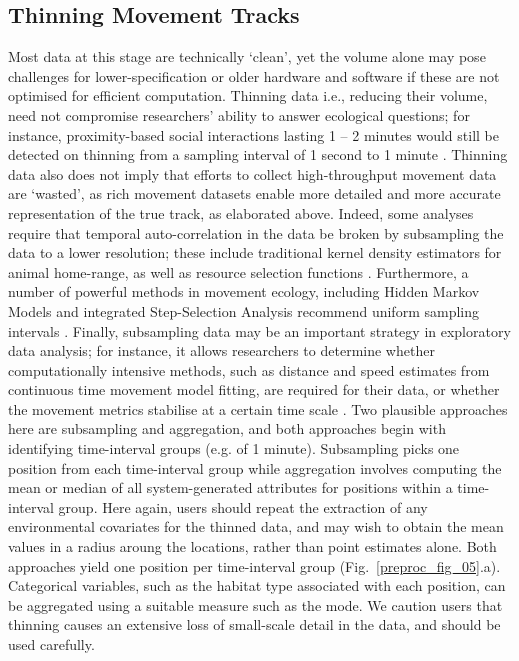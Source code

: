     \subsection*{Thinning Movement Tracks}

    Most data at this stage are technically ‘clean', yet the volume alone may pose challenges for lower-specification or older hardware and software if these are not optimised for efficient computation.
    Thinning data i.e., reducing their volume, need not compromise researchers' ability to answer ecological questions; for instance, proximity-based social interactions lasting 1 -- 2 minutes would still be detected on thinning from a sampling interval of 1 second to 1 minute \citep[][]{aspillaga2021a}.
    Thinning data also does not imply that efforts to collect high-throughput movement data are ‘wasted', as rich movement datasets enable more detailed and more accurate representation of the true track, as elaborated above. 
    Indeed, some analyses require that temporal auto-correlation in the data be broken by subsampling the data to a lower resolution; these include traditional kernel density estimators for animal home-range, as well as resource selection functions \citep{fleming2014a,manly2007,dupke2017}.
    Furthermore, a number of powerful methods in movement ecology, including Hidden Markov Models and integrated Step-Selection Analysis recommend uniform sampling intervals \citep{avgar2016,langrock2012,michelot2016}.
    Finally, subsampling data may be an important strategy in exploratory data analysis; for instance, it allows researchers to determine whether computationally intensive methods, such as distance and speed estimates from continuous time movement model fitting, are required for their data, or whether the movement metrics stabilise at a certain time scale \citep[][]{noonan2019}.
    Two plausible approaches here are subsampling and aggregation, and both approaches begin with identifying time-interval groups (e.g. of 1 minute).
    Subsampling picks one position from each time-interval group while aggregation involves computing the mean or median of all system-generated attributes for positions within a time-interval group.
    Here again, users should repeat the extraction of any environmental covariates for the thinned data, and may wish to obtain the mean values in a radius aroung the locations, rather than point estimates alone.
    Both approaches yield one position per time-interval group (Fig.~\ref{preproc_fig_05}.a).
    Categorical variables, such as the habitat type associated with each position, can be aggregated using a suitable measure such as the mode.
    We caution users that thinning causes an extensive loss of small-scale detail in the data, and should be used carefully.

